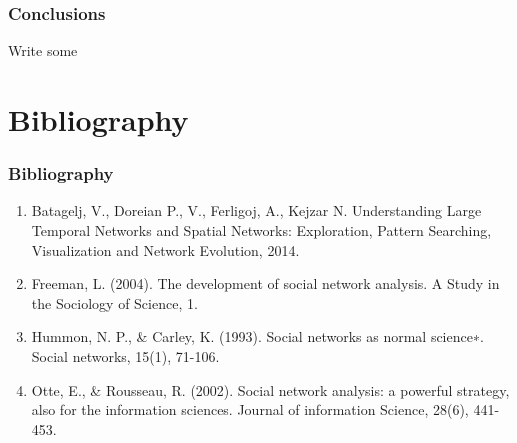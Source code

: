 \documentclass[hyperref={pdfstartview={FitBH -32768},
                         pdfpagemode=FullScreen,
                         plainpages=false,
                         colorlinks=true}
              ]{beamer}
\begin{document}
\begin{frame}[fragile]
\frametitle{Conclusions}
\small

Write some \medskip

\end{frame}

\section{Bibliography}  


\begin{frame}[fragile]
\frametitle{Bibliography}
\small

\begin{enumerate}
\item Batagelj, V., Doreian P., V., Ferligoj, A., Kejzar N. Understanding Large Temporal Networks and Spatial Networks: Exploration, Pattern Searching, Visualization and Network Evolution, 2014.
\item Freeman, L. (2004). The development of social network analysis. A Study in the Sociology of Science, 1.
\item Hummon, N. P., & Carley, K. (1993). Social networks as normal science∗. Social networks, 15(1), 71-106.
\item Otte, E., & Rousseau, R. (2002). Social network analysis: a powerful strategy, also for the information sciences. Journal of information Science, 28(6), 441-453. 
\end{enumerate}
\end{frame}
\end{document}
